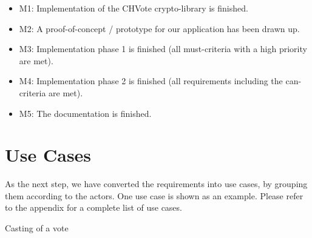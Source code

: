 \begin{itemize}
	\item M1: Implementation of the CHVote crypto-library is finished.
	\item M2: A proof-of-concept / prototype for our application has been drawn up.
	\item M3: Implementation phase 1 is finished (all must-criteria with a high priority are met).
	\item M4: Implementation phase 2 is finished (all requirements including the can-criteria are met).
	\item M5: The documentation is finished.
\end{itemize}

\section{Use Cases}
As the next step, we have converted the requirements into use cases, by grouping them according to the actors. One use case is shown as an example. Please refer to the appendix for a complete list of use cases.
\begin{usecase}{Casting of a vote}
\end{usecase}
